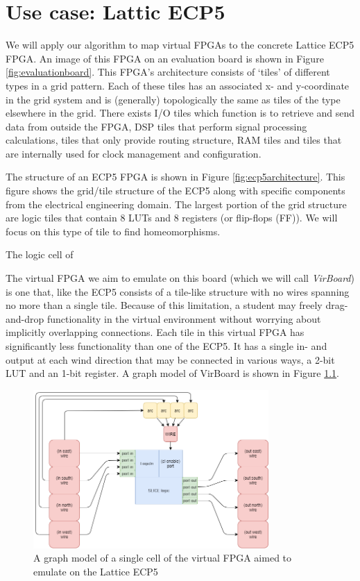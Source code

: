 \chapter{Use case: Lattic ECP5}
We will apply our algorithm to map virtual FPGAs to the concrete Lattice ECP5 FPGA. An image of this FPGA on an evaluation board is shown in Figure \ref{fig:evaluationboard}. This FPGA's architecture consists of `tiles' of different types in a grid pattern. Each of these tiles has an associated x- and y-coordinate in the grid system and is (generally) topologically the same as tiles of the type elsewhere in the grid. There exists I/O tiles which function is to retrieve and send data from outside the FPGA, DSP tiles that perform signal processing calculations, tiles that only provide routing structure, RAM tiles and tiles that are internally used for clock management and configuration.

The structure of an ECP5 FPGA is shown in Figure \ref{fig:ecp5architecture}. This figure shows the grid/tile structure of the ECP5 along with specific components from the electrical engineering domain. The largest portion of the grid structure are logic tiles that contain 8 LUTs and 8 registers (or flip-flops (FF)). We will focus on this type of tile to find homeomorphisms.

The logic cell of 

The virtual FPGA we aim to emulate on this board (which we will call \textit{VirBoard}) is one that, like the ECP5 consists of a tile-like structure with no wires spanning no more than a single tile. Because of this limitation, a student may freely drag-and-drop functionality in the virtual environment without worrying about implicitly overlapping connections. Each tile in this virtual FPGA has significantly less functionality than one of the ECP5. It has a single in- and output at each wind direction that may be connected in various ways, a 2-bit LUT and an 1-bit register. A graph model of VirBoard is shown in Figure \ref{fig:virboard}.

\begin{figure}
\centering
\includegraphics[width=0.8\textwidth]{images/virtualFPGA.png}
\caption{A graph model of a single cell of the virtual FPGA aimed to emulate on the Lattice ECP5}
\label{fig:virboard}
\end{figure}	


